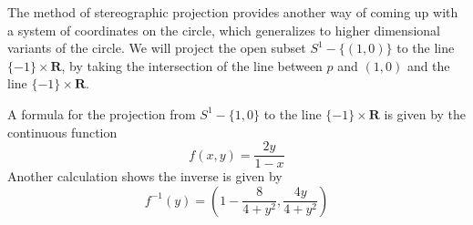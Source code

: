 \begin{example}
    The method of stereographic projection provides another way of coming up with a system of coordinates on the circle, which generalizes to higher dimensional variants of the circle. We will project the open subset $S^1 - \{ (1,0) \}$ to the line $\{ -1 \} \times \mathbf{R}$, by taking the intersection of the line between $p$ and $(1,0)$ and the line $\{ -1 \} \times \mathbf{R}$.

    A formula for the projection from $S^1 - \{ 1, 0 \}$ to the line $\{ -1 \} \times \mathbf{R}$ is given by the continuous function
    \[ f(x,y) = \frac{2y}{1-x} \]
    Another calculation shows the inverse is given by
    \[ f^{-1}(y) = \left(1 - \frac{8}{4 + y^2} , \frac{4y}{4 + y^2} \right) \]


\end{example}
